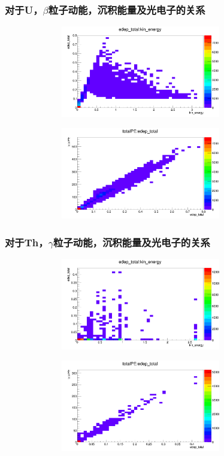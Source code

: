 \begin{frame}
    \frametitle{对于U，$\beta$粒子动能，沉积能量及光电子的关系}
    \includegraphics[width=12cm,height=4cm]{data/U_beta_edep_vs_kine.png}

    \includegraphics[width=12cm,height=4cm]{data/U_beta_totalPE_vs_edep.png}
\end{frame}

\begin{frame}
    \frametitle{对于Th，$\gamma$粒子动能，沉积能量及光电子的关系}
    \includegraphics[width=12cm,height=4cm]{data/Th_gamma_edep_vs_kine.png}

    \includegraphics[width=12cm,height=4cm]{data/Th_gamma_totalPE_vs_edep.png}
\end{frame}


